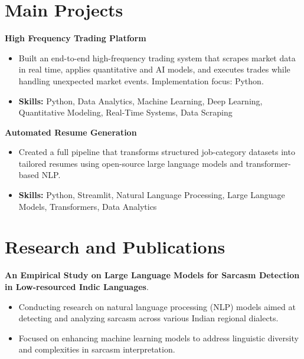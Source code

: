 \documentclass[a4paper,11pt]{article}
\begin{document}
\section{\textbf{Main Projects}}

\vspace{1mm}
  \textbf{High Frequency Trading Platform  }
\vspace{-1.5mm} %
\begin{itemize}
  \item Built an end-to-end high-frequency trading system that scrapes market data in real time, applies quantitative and AI models, and executes trades while handling unexpected market events. Implementation focus: Python.
\vspace{-3mm}
  \item \textbf{Skills:} Python, Data Analytics, Machine Learning, Deep Learning, Quantitative Modeling, Real-Time Systems, Data Scraping
\end{itemize}


\vspace{1mm}
   \textbf{Automated Resume Generation }
\vspace{-1.5mm} %
\begin{itemize}
  \item Created a full pipeline that transforms structured job-category datasets into tailored resumes using open-source large language models and transformer-based NLP.
\vspace{-3mm}
  \item \textbf{Skills:} Python, Streamlit, Natural Language Processing, Large Language Models, Transformers, Data Analytics
\end{itemize}



\section{\textbf{Research and Publications} \hfill }
\vspace{1mm}
  \textbf{An Empirical Study on Large Language Models for Sarcasm Detection in Low-resourced Indic Languages}.
\vspace{-1mm} %
\begin{itemize}
  \item Conducting research on natural language processing (NLP) models aimed at detecting and analyzing sarcasm across various Indian regional dialects.
\vspace{-3mm}
  \item Focused on enhancing machine learning models to address linguistic diversity and complexities in sarcasm interpretation.
\end{itemize}
\end{document}
